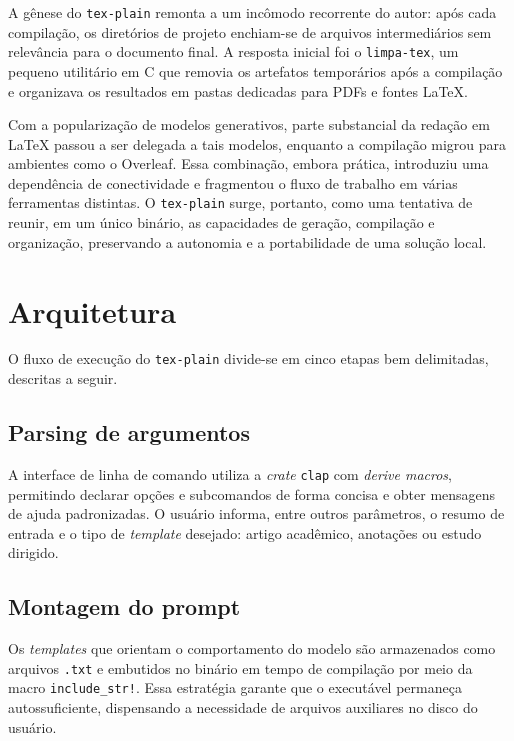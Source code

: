 \documentclass[11pt,a4paper]{article}
\begin{document}
A gênese do \texttt{tex-plain} remonta a um incômodo recorrente do autor: após cada compilação, os diretórios de projeto enchiam-se de arquivos intermediários sem relevância para o documento final. A resposta inicial foi o \texttt{limpa-tex}, um pequeno utilitário em C que removia os artefatos temporários após a compilação e organizava os resultados em pastas dedicadas para PDFs e fontes LaTeX.

Com a popularização de modelos generativos, parte substancial da redação em LaTeX passou a ser delegada a tais modelos, enquanto a compilação migrou para ambientes como o Overleaf. Essa combinação, embora prática, introduziu uma dependência de conectividade e fragmentou o fluxo de trabalho em várias ferramentas distintas. O \texttt{tex-plain} surge, portanto, como uma tentativa de reunir, em um único binário, as capacidades de geração, compilação e organização, preservando a autonomia e a portabilidade de uma solução local.

\section{Arquitetura}

O fluxo de execução do \texttt{tex-plain} divide-se em cinco etapas bem delimitadas, descritas a seguir.

\subsection{Parsing de argumentos}

A interface de linha de comando utiliza a \textit{crate} \texttt{clap} com \textit{derive macros}, permitindo declarar opções e subcomandos de forma concisa e obter mensagens de ajuda padronizadas. O usuário informa, entre outros parâmetros, o resumo de entrada e o tipo de \textit{template} desejado: artigo acadêmico, anotações ou estudo dirigido.

\subsection{Montagem do prompt}

Os \textit{templates} que orientam o comportamento do modelo são armazenados como arquivos \texttt{.txt} e embutidos no binário em tempo de compilação por meio da macro \texttt{include\_str!}. Essa estratégia garante que o executável permaneça autossuficiente, dispensando a necessidade de arquivos auxiliares no disco do usuário.
\end{document}
